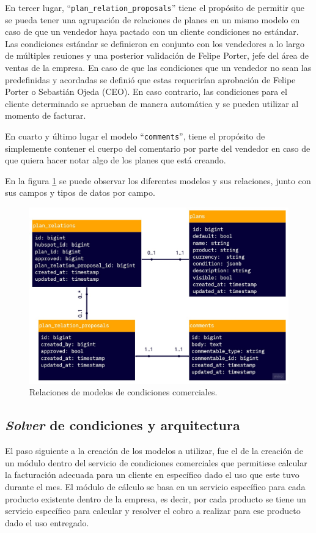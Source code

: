     En tercer lugar, ``\texttt{plan\_relation\_proposals}'' tiene el propósito de permitir que se pueda tener una agrupación de relaciones de planes en un mismo modelo en caso de que un vendedor haya pactado con un cliente condiciones no estándar. Las condiciones estándar se definieron en conjunto con los vendedores a lo largo de múltiples reuiones y una posterior validación de Felipe Porter, jefe del área de ventas de la empresa. En caso de que las condiciones que un vendedor no sean las predefinidas y acordadas se definió que estas requerirían aprobación de Felipe Porter o Sebastián Ojeda (CEO). En caso contrario, las condiciones para el cliente determinado se aprueban de manera automática y se pueden utilizar al momento de facturar.
    
    En cuarto y último lugar el modelo ``\texttt{comments}'', tiene el propósito de simplemente contener el cuerpo del comentario por parte del vendedor en caso de que quiera hacer notar algo de los planes que está creando.

    En la figura \ref{fig:cc_relations} se puede observar los diferentes modelos y sus relaciones, junto con sus campos y tipos de datos por campo.
    
    \begin{figure}
      \centering
      \includegraphics[width=0.75\linewidth]{figures/cc/cc_relations.jpg}
      \caption{Relaciones de modelos de condiciones comerciales.}
      \label{fig:cc_relations}
    \end{figure}

  \subsection{\textit{Solver} de condiciones y arquitectura}

    El paso siguiente a la creación de los modelos a utilizar, fue el de la creación de un módulo dentro del servicio de condiciones comerciales  que permitiese calcular la facturación adecuada para un cliente en específico dado el uso que este tuvo durante el mes. El módulo de cálculo se basa en un servicio específico para cada producto existente dentro de la empresa, es decir, por cada producto se tiene un servicio específico para calcular y resolver el cobro a realizar para ese producto dado el uso entregado.

